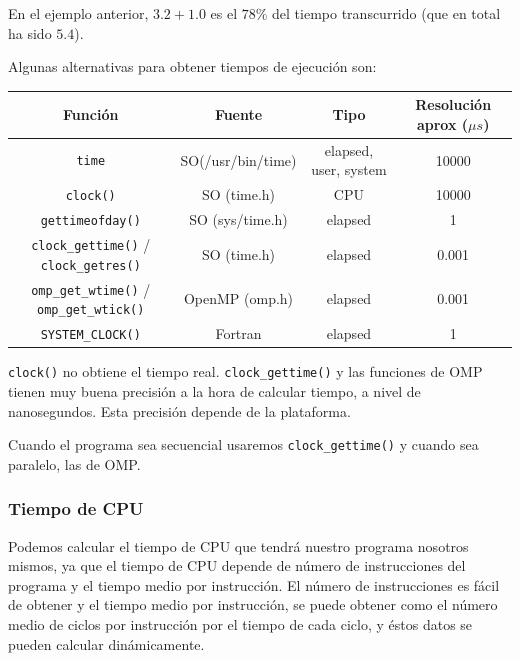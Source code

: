 \documentclass[10pt,a4paper,spanish]{report}
\begin{document}
En el ejemplo anterior, $3.2+1.0$ es el $78\%$ del tiempo transcurrido (que en total ha sido $5.4$).

Algunas alternativas para obtener tiempos de ejecución son:

\begin{center}
\begin{tabular}{|c|c|c|c|}
\hline
\rowcolor[rgb]{0.2,0.4,0.8} \textcolor[rgb]{1,1,1}{Función} & \textcolor[rgb]{1,1,1}{Fuente} & \textcolor[rgb]{1,1,1}{Tipo} & \textcolor[rgb]{1,1,1}{Resolución aprox ($\mu s$)} \\
\hline
\verb*|time| & SO(/usr/bin/time) & elapsed, user, system & 10000 \\
\hline
\verb*|clock()| & SO (time.h) & CPU & 10000 \\
\hline
\verb*|gettimeofday()| & SO (sys/time.h) & elapsed & 1 \\
\hline
\verb*|clock_gettime()| / \verb*|clock_getres()| & SO (time.h) & elapsed & 0.001 \\
\hline
\verb*|omp_get_wtime()| / \verb*|omp_get_wtick()| & OpenMP (omp.h) & elapsed & 0.001 \\
\hline
\verb*|SYSTEM_CLOCK()| & Fortran & elapsed & 1 \\
\hline
\end{tabular}
\end{center}

\verb*|clock()| no obtiene el tiempo real. \verb*|clock_gettime()| y las funciones de OMP tienen muy buena precisión a la hora de calcular tiempo, a nivel de nanosegundos. Esta precisión depende de la plataforma. 

Cuando el programa sea secuencial usaremos \verb*|clock_gettime()| y cuando sea paralelo, las de OMP.

\textcolor[rgb]{0.2,0.4,0.8}{\subsubsection{Tiempo de CPU}}

Podemos calcular el tiempo de CPU que tendrá nuestro programa nosotros mismos, ya que el tiempo de CPU depende de número de instrucciones del programa y el tiempo medio por instrucción. El número de instrucciones es fácil de obtener y el tiempo medio por instrucción, se puede obtener como el número medio de ciclos por instrucción por el tiempo de cada ciclo, y éstos datos se pueden calcular dinámicamente.
\end{document}
